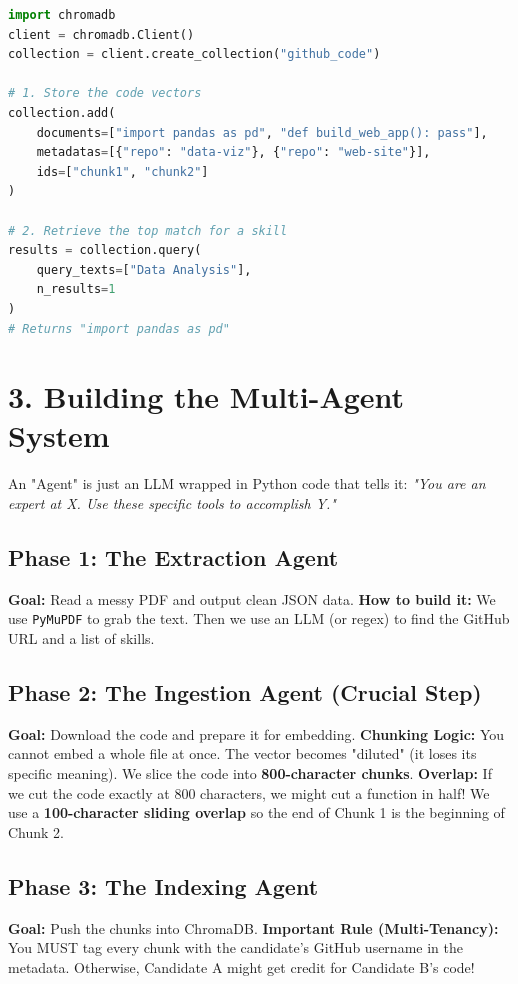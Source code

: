 \documentclass[12pt,a4paper]{article}
\begin{document}
\begin{lstlisting}[language=Python, caption=Storing and Retrieving in ChromaDB]
import chromadb
client = chromadb.Client()
collection = client.create_collection("github_code")

# 1. Store the code vectors
collection.add(
    documents=["import pandas as pd", "def build_web_app(): pass"],
    metadatas=[{"repo": "data-viz"}, {"repo": "web-site"}],
    ids=["chunk1", "chunk2"]
)

# 2. Retrieve the top match for a skill
results = collection.query(
    query_texts=["Data Analysis"],
    n_results=1
)
# Returns "import pandas as pd"
\end{lstlisting}

\section{3. Building the Multi-Agent System}
An "Agent" is just an LLM wrapped in Python code that tells it: \textit{"You are an expert at X. Use these specific tools to accomplish Y."}

\subsection{Phase 1: The Extraction Agent}
\textbf{Goal:} Read a messy PDF and output clean JSON data.
\textbf{How to build it:} We use \texttt{PyMuPDF} to grab the text. Then we use an LLM (or regex) to find the GitHub URL and a list of skills.

\subsection{Phase 2: The Ingestion Agent (Crucial Step)}
\textbf{Goal:} Download the code and prepare it for embedding.
\textbf{Chunking Logic:} You cannot embed a whole file at once. The vector becomes "diluted" (it loses its specific meaning). We slice the code into \textbf{800-character chunks}.
\textbf{Overlap:} If we cut the code exactly at 800 characters, we might cut a function in half! We use a \textbf{100-character sliding overlap} so the end of Chunk 1 is the beginning of Chunk 2.

\subsection{Phase 3: The Indexing Agent}
\textbf{Goal:} Push the chunks into ChromaDB.
\textbf{Important Rule (Multi-Tenancy):} You MUST tag every chunk with the candidate's GitHub username in the metadata. Otherwise, Candidate A might get credit for Candidate B's code!
\end{document}
